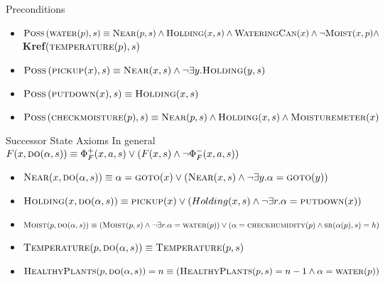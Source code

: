 \begin{frame}{Preconditions}
    \begin{itemize}
        \item $\textsc{Poss}\left( \textsc{water}(p), s \right) \equiv \textsc{Near}(p,s) \land \textsc{Holding}(x,s) \land \textsc{WateringCan}(x) \land \neg\textsc{Moist}(x,p) \land $ \textbf{Kref}$(\textsc{temperature}(p),s)$
        \item $\textsc{Poss}\left( \textsc{pickup}(x), s \right) \equiv \textsc{Near}(x,s) \land \neg \exists y.\textsc{Holding}(y,s)$
        \item $\textsc{Poss}\left( \textsc{putdown}(x), s \right) \equiv \textsc{Holding}(x,s)$
        \item $\textsc{Poss}\left( \textsc{checkmoisture}(p), s \right) \equiv \textsc{Near}(p,s) \land \textsc{Holding}(x,s) \land \textsc{Moisturemeter}(x)$
    \end{itemize}
\end{frame}

\begin{frame}{Successor State Axioms}
    In general $F(x,\textsc{do}(\alpha,s)) \equiv \Phi_F^+(x,a,s) \lor (F(x,s) \land \neg \Phi_F^-(x,a,s))$
    \vspace*{0.5cm}
    \begin{itemize}
        \item $\textsc{Near}(x,\textsc{do}(\alpha,s)) \equiv \alpha = \textsc{goto}(x)
        \lor \left( \textsc{Near}(x,s) \land \neg \exists
        y.\alpha=\textsc{goto}(y)\right)$
        \item $\textsc{Holding}(x,\textsc{do}(\alpha,s))\equiv \textsc{pickup}(x) \lor \left( Holding(x,s) \land \neg \exists r.\alpha=\textsc{putdown}(x)\right)$
        \item $\textsc{Moist}(p,\textsc{do}(\alpha,s)) \equiv \left( \textsc{Moist}(p,s) \land \neg \exists r.\alpha=\textsc{water}(p) \right) \lor \left( \alpha = \textsc{checkhumidity}(p) \land \textsc{sr}(\alpha(p),s)=h \right)$ 
        \item $\textsc{Temperature}(p,\textsc{do}(\alpha,s)) \equiv \textsc{Temperature}(p,s)$ 
        \item $\textsc{HealthyPlants}(p,\textsc{do}(\alpha,s)) = n \equiv \left( \textsc{HealthyPlants}(p,s) = n-1 \land \alpha = \textsc{water}(p) \right) $
    \end{itemize}
\end{frame}

